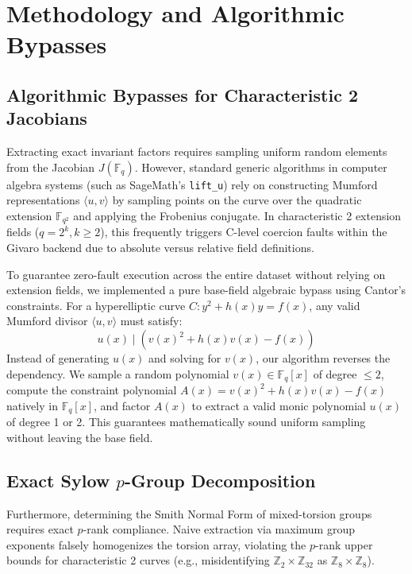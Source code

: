 \documentclass[letterpaper, 11pt]{article}
\begin{document}
\section{Methodology and Algorithmic Bypasses}

\subsection{Algorithmic Bypasses for Characteristic 2 Jacobians}
Extracting exact invariant factors requires sampling uniform random elements from the Jacobian $J(\mathbb{F}_q)$. However, standard generic algorithms in computer algebra systems (such as SageMath's \texttt{lift\_u}) rely on constructing Mumford representations $\langle u, v \rangle$ by sampling points on the curve over the quadratic extension $\mathbb{F}_{q^2}$ and applying the Frobenius conjugate. In characteristic 2 extension fields ($q = 2^k, k \ge 2$), this frequently triggers C-level coercion faults within the Givaro backend due to absolute versus relative field definitions.

To guarantee zero-fault execution across the entire dataset without relying on extension fields, we implemented a pure base-field algebraic bypass using Cantor's constraints. For a hyperelliptic curve $C: y^2 + h(x)y = f(x)$, any valid Mumford divisor $\langle u, v \rangle$ must satisfy:
\begin{equation}
    u(x) \mid \left( v(x)^2 + h(x)v(x) - f(x) \right)
\end{equation}
Instead of generating $u(x)$ and solving for $v(x)$, our algorithm reverses the dependency. We sample a random polynomial $v(x) \in \mathbb{F}_q[x]$ of degree $\le 2$, compute the constraint polynomial $A(x) = v(x)^2 + h(x)v(x) - f(x)$ natively in $\mathbb{F}_q[x]$, and factor $A(x)$ to extract a valid monic polynomial $u(x)$ of degree 1 or 2. This guarantees mathematically sound uniform sampling without leaving the base field.

\subsection{Exact Sylow \texorpdfstring{$p$}{p}-Group Decomposition}
Furthermore, determining the Smith Normal Form of mixed-torsion groups requires exact $p$-rank compliance. Naive extraction via maximum group exponents falsely homogenizes the torsion array, violating the $p$-rank upper bounds for characteristic 2 curves (e.g., misidentifying $\mathbb{Z}_2 \times \mathbb{Z}_{32}$ as $\mathbb{Z}_8 \times \mathbb{Z}_8$). 
\end{document}
